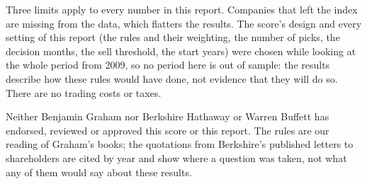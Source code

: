 \documentclass[11pt,a4paper]{article}
\begin{document}
Three limits apply to every number in this report. Companies that left the index are missing from the data, which flatters the results. The score's design and every setting of this report (the rules and their weighting, the number of picks, the decision months, the sell threshold, the start years) were chosen while looking at the whole period from 2009, so no period here is out of sample: the results describe how these rules would have done, not evidence that they will do so. There are no trading costs or taxes.

Neither Benjamin Graham nor Berkshire Hathaway or Warren Buffett has endorsed, reviewed or approved this score or this report. The rules are our reading of Graham's books; the quotations from Berkshire's published letters to shareholders are cited by year and show where a question was taken, not what any of them would say about these results.
\end{document}
